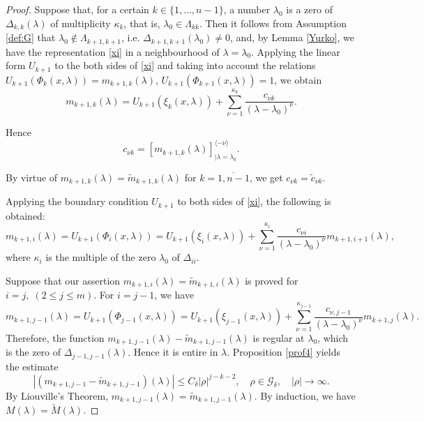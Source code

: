 \documentclass[reqno,12pt,centertags]{amsart}
\numberwithin{equation}{section}
\theoremstyle{definition}
\begin{document}
\begin{proof}
Suppose that, for a certain $k \in \{ 1, \dots, n-1\}$, a number $\lambda_0$ is a zero of $\Delta_{k,k}(\lambda)$ of multiplicity $\kappa_k$, that is, $\lambda_0 \in \Lambda_{k k}$. Then it follows from Assumption \ref{def:G} that $\lambda_0 \notin \Lambda_{k+1, k+1}$, i.e. $\Delta_{k+1, k+1}\left(\lambda_0\right) \neq 0$, and, by Lemma \ref{Yurko}, we have the representation \eqref{xi} in a neighbourhood of $\lambda=\lambda_0$. Applying the linear form $U_{k+1}$ to the both sides of \eqref{xi} and taking into account the relations $U_{k+1}\left(\Phi_k(x, \lambda)\right)=m_{k+1, k}(\lambda)$, $U_{k+1}\left(\Phi_{k+1}(x, \lambda)\right)=1$, we obtain
		$$
		m_{k+1, k}(\lambda)=U_{k+1}\left(\xi_k(x, \lambda)\right)+\sum_{\nu=1}^{\kappa_k} \frac{c_{\nu k}}{\left(\lambda-\lambda_0\right)^\nu} .
		$$
		
		Hence
		$$
		c_{\nu k}=\left[m_{k+1, k}(\lambda)\right]_{\mid \lambda=\lambda_0}^{\langle-\nu\rangle} .
		$$
		
		By virtue of $m_{k+1,k}(\lambda)=\tilde{m}_{k+1,k}(\lambda)$ for  $k=\overline{1,n-1}$, we get $c_{\nu k}=\tilde{c}_{\nu k}$. 
		
		Applying the boundary condition $U_{k+1}$ to both sides of \eqref{xi}, the following is obtained:
			\begin{equation}
				m_{k+1,i}(\lambda)=U_{k+1}(\Phi_{i}(x, \lambda))=U_{k+1}(\xi_{i}(x, \lambda))+\sum_{\nu=1}^{\kappa_i}\frac{c_{\nu i}}{\left(\lambda-\lambda_0\right)^\nu} m_{k+1,i+1}(\lambda),
		\end{equation}
	where $\kappa_i$ is the multiple of the zero $\lambda_{0}$ of $\Delta_{ii}$.
		
	Suppose that our assertion $m_{k+1,i}(\lambda)=\tilde{m}_{k+1,i}(\lambda)$ is proved for $i=j,  \;(2\leq j \leq m)$. For $i=j-1$, we have
		\begin{equation}
			m_{k+1,j\!-\!1}(\lambda)\!=\!U_{k+1}(\Phi_{j\!-\!1}(x, \lambda))\!=\!U_{k+1}(\xi_{j-1}(x, \lambda))\!\!+\!\!\!\sum_{\nu=1}^{\kappa_{j\!-\!1}}\!\frac{c_{\nu, j-1}}{\left(\lambda-\lambda_0\right)^\nu} m_{k+1,j}(\lambda).
		\end{equation}
	Therefore, the function $m_{k+1,j-1}(\lambda)-\tilde{m}_{k+1,j-1}(\lambda)$ is regular at $\lambda_{0}$, which is the zero of $\Delta_{j-1,j-1}(\lambda)$. Hence it is entire in $\lambda$. Proposition \eqref{prof4} yields the
	estimate
	\begin{equation}
		|(m_{k+1,j-1}-\tilde{m}_{k+1,j-1})(\lambda)|\leq C_{\delta}|\rho|^{j-k-2},\quad\rho\in\mathcal{G}_{\delta},\quad|\rho|\rightarrow\infty.
	\end{equation}
By Liouville’s Theorem, $m_{k+1,j-1}(\lambda)=\tilde{m}_{k+1,j-1}(\lambda)$. By induction, we have $M(\lambda)=\tilde{M}(\lambda)$.
\end{proof}	
\end{document}
